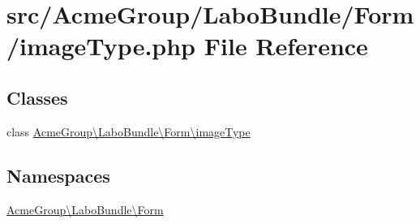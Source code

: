 \hypertarget{image_type_8php}{\section{src/\+Acme\+Group/\+Labo\+Bundle/\+Form/image\+Type.php File Reference}
\label{image_type_8php}
}
\subsection*{Classes}
\begin{DoxyCompactItemize}
\item 
class \hyperlink{class_acme_group_1_1_labo_bundle_1_1_form_1_1image_type}{Acme\+Group\textbackslash{}\+Labo\+Bundle\textbackslash{}\+Form\textbackslash{}image\+Type}
\end{DoxyCompactItemize}
\subsection*{Namespaces}
\begin{DoxyCompactItemize}
\item 
 \hyperlink{namespace_acme_group_1_1_labo_bundle_1_1_form}{Acme\+Group\textbackslash{}\+Labo\+Bundle\textbackslash{}\+Form}
\end{DoxyCompactItemize}
